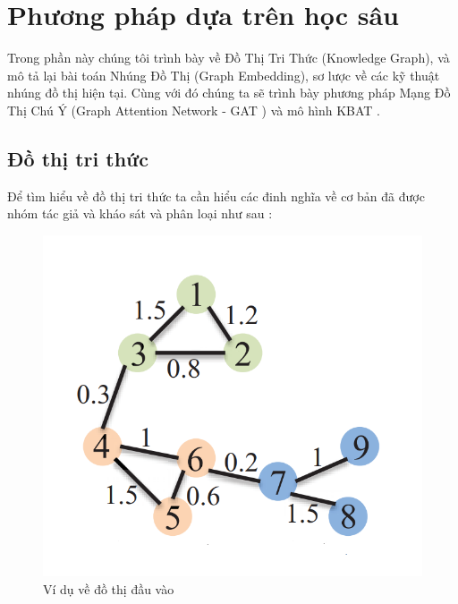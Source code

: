 \section{Phương pháp dựa trên học sâu}
Trong phần này chúng tôi trình bày về Đồ Thị Tri Thức (Knowledge Graph), và mô tả lại bài toán Nhúng Đồ Thị (Graph Embedding), sơ lược về các kỹ thuật nhúng đồ thị hiện tại. Cùng với đó chúng ta sẽ trình bày phương pháp Mạng Đồ Thị Chú Ý (Graph Attention Network - GAT \cite{velivckovic2017graph}) và mô hình KBAT \cite{nathani2019learning}.
\subsection{Đồ thị tri thức}

Để tìm hiểu về đồ thị tri thức ta cần hiểu các đinh nghĩa về cơ bản đã được nhóm tác giả \cite{cai2018comprehensive} và \cite{goyal2018graph} kháo sát và phân loại như sau :

\begin{figure}[htp]
	\centering
	\includegraphics[width=7 cm]{images/graph_emb_1.png}
	\caption{Ví dụ về đồ thị đầu vào}
	\label{fig:graphInput}
\end{figure}

